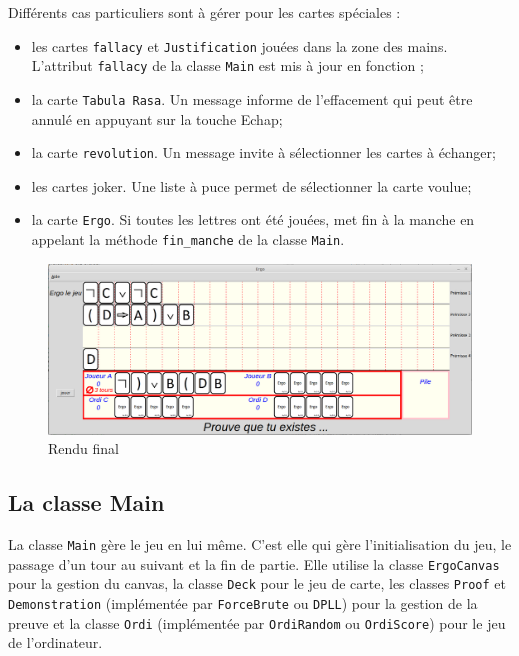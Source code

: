 \documentclass[12pt, a4paper]{article}
\begin{document}
Différents cas particuliers sont à gérer pour les cartes spéciales :
\begin{itemize}
\item les cartes \texttt{fallacy} et \texttt{Justification} jouées dans la zone des mains. L'attribut \texttt{fallacy} de la classe \texttt{Main} est mis à jour en fonction ;
\item la carte \texttt{Tabula Rasa}. Un message informe de l'effacement qui peut être annulé en appuyant sur la touche Echap;
\item la carte \texttt{revolution}. Un message invite à sélectionner les cartes à échanger;
\item les cartes joker. Une liste à puce permet de sélectionner la carte voulue;
\item la carte \texttt{Ergo}. Si toutes les lettres ont été jouées, met fin à la manche en appelant la méthode \texttt{fin\_manche} de la classe \texttt{Main}.
\end{itemize}

\begin{figure}
\begin{center}
\includegraphics[scale=.35]{../images/ima2.png}
\end{center}
\caption{Rendu final}
\label{GI}
\end{figure}

\subsection{La classe Main}

La classe \texttt{Main} gère le jeu en lui même. C'est elle qui gère l'initialisation du jeu, le passage d'un tour au suivant et la fin de partie. Elle utilise la classe \texttt{ErgoCanvas} pour la gestion du canvas, la classe \texttt{Deck} pour le jeu de carte, les classes \texttt{Proof} et \texttt{Demonstration} (implémentée par \texttt{ForceBrute} ou \texttt{DPLL}) pour la gestion de la preuve et la classe \texttt{Ordi} (implémentée par \texttt{OrdiRandom} ou \texttt{OrdiScore}) pour le jeu de l'ordinateur. 
\end{document}
